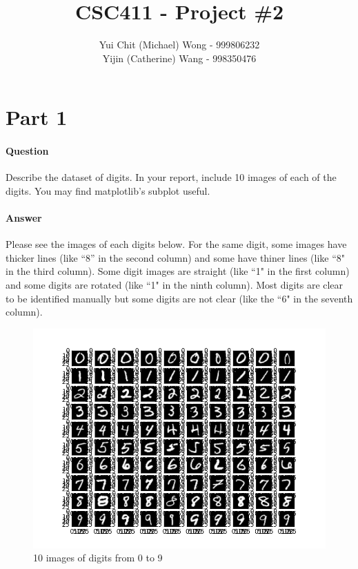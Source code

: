 \documentclass[11pt,twoside]{article}
\begin{document}
\title{CSC411 - Project \#2}
\author{Yui Chit (Michael) Wong - 999806232\\Yijin (Catherine) Wang - 998350476}
\maketitle

\clearpage

\section*{Part 1}
\paragraph{Question}
Describe the dataset of digits. In your report, include 10 images of each of the digits. You may find matplotlib’s subplot useful.

\paragraph{Answer}
Please see the images of each digits below. For the same digit, some images have thicker lines (like ``8'' in the second column) and some have thiner lines (like ``8" in the third column). Some digit images are straight (like ``1" in the first column) and some digits are rotated (like ``1" in the ninth column). Most digits are clear to be identified manually but some digits are not clear (like the ``6" in the seventh column). 

\begin{figure}[h]
	\centering
	\includegraphics[scale=0.8]{part1.png}
	\caption*{10 images of digits from 0 to 9}
\end{figure}
\end{document}
